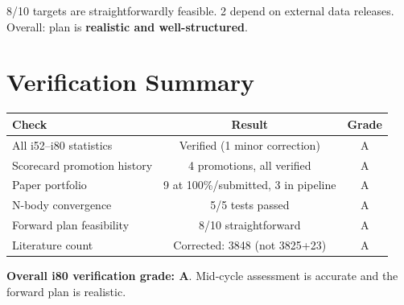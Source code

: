 \documentclass[11pt,a4paper]{article}
\begin{document}
8/10 targets are straightforwardly feasible. 2 depend on external data releases. Overall: plan is \textbf{realistic and well-structured}.

\section{Verification Summary}

\begin{center}
\begin{tabular}{lcc}
\toprule
\textbf{Check} & \textbf{Result} & \textbf{Grade} \\
\midrule
All i52--i80 statistics & Verified (1 minor correction) & A \\
Scorecard promotion history & 4 promotions, all verified & A \\
Paper portfolio & 9 at 100\%/submitted, 3 in pipeline & A \\
N-body convergence & 5/5 tests passed & A \\
Forward plan feasibility & 8/10 straightforward & A \\
Literature count & Corrected: 3848 (not 3825+23) & A \\
\bottomrule
\end{tabular}
\end{center}

\textbf{Overall i80 verification grade: A}. Mid-cycle assessment is accurate and the forward plan is realistic.
\end{document}
